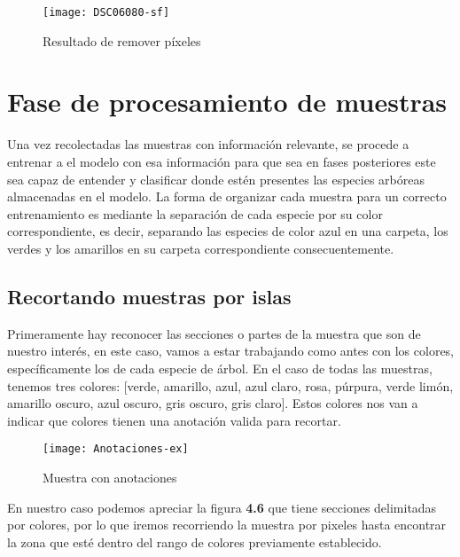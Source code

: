 \begin{figure} [!b]
	\centering
	\begin{minipage}[b]{0.5\textwidth}
		\texttt{[image: DSC06080-sf]}
		\caption{Resultado de remover píxeles}
	\end{minipage}
\end{figure}

\break

\section{Fase de procesamiento de muestras}
Una vez recolectadas las muestras con información relevante, se procede a  entrenar a el modelo con esa información para que sea en fases posteriores este sea capaz de entender y clasificar donde estén presentes las especies arbóreas almacenadas en el modelo. La forma de organizar cada muestra para un correcto entrenamiento es mediante la separación de cada especie por su color correspondiente, es decir, separando las especies de color azul en una carpeta, los verdes y los amarillos en su carpeta correspondiente consecuentemente.

\subsection{Recortando muestras por islas}
Primeramente hay reconocer las secciones o partes de la muestra que son de nuestro interés, en este caso, vamos a estar trabajando como antes con los colores, específicamente los de cada especie de árbol. En el caso de todas las muestras, tenemos tres colores: [verde, amarillo, azul, azul claro, rosa, púrpura, verde limón, amarillo oscuro, azul oscuro, gris oscuro, gris claro]. Estos colores nos van a indicar que colores tienen una anotación valida para recortar.


\begin{figure}[H]
  \centering
  \begin{minipage}[b]{0.5\textwidth}
        \texttt{[image: Anotaciones-ex]}
    \caption{Muestra con anotaciones}
  \end{minipage}
\end{figure}

En nuestro caso podemos apreciar la figura \textbf{4.6} que tiene secciones delimitadas por colores, por lo que iremos recorriendo la muestra por pixeles hasta encontrar la zona que esté dentro del rango de colores previamente establecido.


